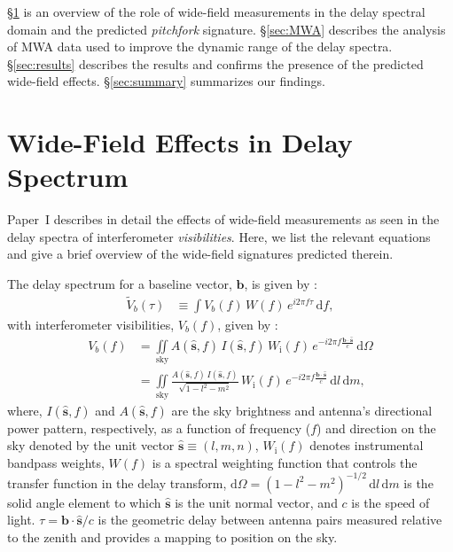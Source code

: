 \documentclass[preprint2,apjl,numberedappendix,twocolappendix,appendixfloats]{emulateapj}
\newcommand{\dif}{\mathrm{d}}
\begin{document}
\S\ref{sec:wide-field} is an overview of the role of wide-field measurements in the delay spectral domain and the predicted {\it pitchfork} signature. \S\ref{sec:MWA} describes the analysis of MWA data used to improve the dynamic range of the delay spectra. \S\ref{sec:results} describes the results and confirms the presence of the predicted wide-field effects. \S\ref{sec:summary} summarizes our findings.

\section{Wide-Field Effects in Delay Spectrum}\label{sec:wide-field}

Paper~I describes in detail the effects of wide-field measurements as seen in the delay spectra of interferometer {\it visibilities}. Here, we list the relevant equations and give a brief overview of the wide-field signatures predicted therein. 

The delay spectrum for a baseline vector, $\boldsymbol{b}$, is given by \citep[][Paper~I]{par12a,par12b,thy13}: 
\begin{align}
  \tilde{V}_b(\tau) &\equiv \int V_b(f)\,W(f)\,e^{i2\pi f\tau}\,\dif f,
\end{align}
with interferometer visibilities, $V_b(f)$, given by \citep{van34,zer38,tho01}:
\begin{align} 
  V_b(f) &= \iint\limits_\textrm{sky} A(\hat{\boldsymbol{s}},f)\,I(\hat{\boldsymbol{s}},f)\,W_\textrm{i}(f)\,e^{-i2\pi f\frac{\boldsymbol{b}\cdot\hat{\boldsymbol{s}}}{c}}\,\dif\Omega \\
         &= \iint\limits_\textrm{sky} \frac{A(\hat{\boldsymbol{s}},f)\,I(\hat{\boldsymbol{s}},f)}{\sqrt{1-l^2-m^2}}\,W_\textrm{i}(f)\,e^{-i2\pi f\frac{\boldsymbol{b}\cdot\hat{\boldsymbol{s}}}{c}}\,\dif l\,\dif m, 
\end{align}
where, $I(\hat{\boldsymbol{s}},f)$ and $A(\hat{\boldsymbol{s}},f)$ are the sky brightness and antenna's directional power pattern, respectively, as a function of frequency ($f$) and direction on the sky denoted by the unit vector $\hat{\boldsymbol{s}}\equiv (l,m,n)$, $W_\textrm{i}(f)$ denotes instrumental bandpass weights, $W(f)$ is a spectral weighting function that controls the transfer function in the delay transform, $\dif\Omega=(1-l^2-m^2)^{-1/2}\,\dif l\,\dif m$ is the solid angle element to which $\hat{\boldsymbol{s}}$ is the unit normal vector, and $c$ is the speed of light. $\tau=\boldsymbol{b}\cdot\hat{\boldsymbol{s}}/c$ is the geometric delay between antenna pairs measured relative to the zenith and provides a mapping to position on the sky.
\end{document}
